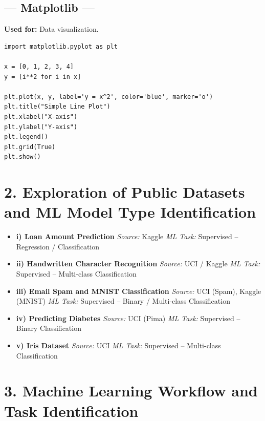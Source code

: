 \documentclass[11pt]{article}
\begin{document}
\subsection*{--- Matplotlib ---}
\textbf{Used for:} Data visualization.
\begin{lstlisting}
import matplotlib.pyplot as plt

x = [0, 1, 2, 3, 4]
y = [i**2 for i in x]

plt.plot(x, y, label='y = x^2', color='blue', marker='o')
plt.title("Simple Line Plot")
plt.xlabel("X-axis")
plt.ylabel("Y-axis")
plt.legend()
plt.grid(True)
plt.show()
\end{lstlisting}

\vspace{0.5cm}
\section*{2. Exploration of Public Datasets and ML Model Type Identification}

\begin{itemize}
    \item \textbf{i) Loan Amount Prediction}  
    \textit{Source:} Kaggle  
    \textit{ML Task:} Supervised – Regression / Classification
    
    \item \textbf{ii) Handwritten Character Recognition}  
    \textit{Source:} UCI / Kaggle  
    \textit{ML Task:} Supervised – Multi-class Classification

    \item \textbf{iii) Email Spam and MNIST Classification}  
    \textit{Source:} UCI (Spam), Kaggle (MNIST)  
    \textit{ML Task:} Supervised – Binary / Multi-class Classification

    \item \textbf{iv) Predicting Diabetes}  
    \textit{Source:} UCI (Pima)  
    \textit{ML Task:} Supervised – Binary Classification

    \item \textbf{v) Iris Dataset}  
    \textit{Source:} UCI  
    \textit{ML Task:} Supervised – Multi-class Classification
\end{itemize}

\section*{3. Machine Learning Workflow and Task Identification}
\end{document}
